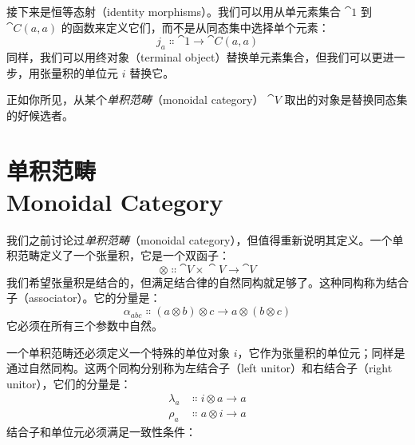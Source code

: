 接下来是恒等态射（identity morphisms）。我们可以用从单元素集合 $\cat{1}$ 到 $\cat{C}(a, a)$ 的函数来定义它们，而不是从同态集中选择单个元素：
\[j_a \Colon \cat{1} \to \cat{C}(a, a)\]
同样，我们可以用终对象（terminal object）替换单元素集合，但我们可以更进一步，用张量积的单位元 $i$ 替换它。

正如你所见，从某个\emph{单积范畴}（monoidal category） $\cat{V}$ 取出的对象是替换同态集的好候选者。

\section{单积范畴\\ \textmd{Monoidal Category}}

我们之前讨论过\emph{单积范畴}（monoidal category），但值得重新说明其定义。一个单积范畴定义了一个张量积，它是一个双函子：
\[\otimes \Colon \cat{V}\times{}\cat{V} \to \cat{V}\]
我们希望张量积是结合的，但满足结合律的自然同构就足够了。这种同构称为结合子（associator）。它的分量是：
\[\alpha_{a b c} \Colon (a \otimes b) \otimes c \to a \otimes (b \otimes c)\]
它必须在所有三个参数中自然。

一个单积范畴还必须定义一个特殊的单位对象 $i$，它作为张量积的单位元；同样是通过自然同构。这两个同构分别称为左结合子（left unitor）和右结合子（right unitor），它们的分量是：
\begin{align*}
  \lambda_a & \Colon i \otimes a \to a \\
  \rho_a    & \Colon a \otimes i \to a
\end{align*}
结合子和单位元必须满足一致性条件：

\begin{figure}[H]
  \centering
\end{figure}

\begin{figure}[H]
  \centering
\end{figure}

